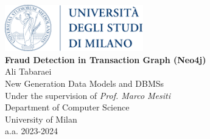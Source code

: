 \begin{center}

    \includegraphics[width=6cm]{structure/unimi.png} \\
    \vspace*{5cm}
    \Large{\textbf{Fraud Detection in Transaction Graph (Neo4j)}} \\
    
    \vspace*{0.2cm}
    \large{Ali Tabaraei} \\
    
    \vspace*{6cm}
    New Generation Data Models and DBMSs \\
    Under the supervision of
    \textit{Prof. Marco Mesiti} \\
    Department of Computer Science \\
    University of Milan \\
    
    \vspace*{3cm}
    a.a. 2023-2024    

\end{center}
\newpage